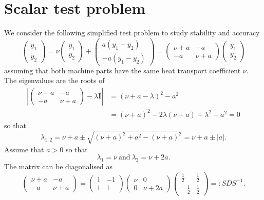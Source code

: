 \documentclass{article}
\newcommand{\ve}[1]{\mathbf{#1}}
\begin{document}
\section*{Scalar test problem}
We consider the following simplified test problem to study stability and accuracy
\begin{equation}
	\begin{pmatrix} \dot{y}_1 \\ \dot{y}_2 \end{pmatrix} = \nu \begin{pmatrix} y_1 \\ y_2 \end{pmatrix} + \begin{pmatrix} a \left( y_1 - y_2 \right) \\ -a (y_1 - y_2) \end{pmatrix}
		= \begin{pmatrix}  \nu + a & -a \\ -a & \nu  +a \end{pmatrix} \begin{pmatrix} y_1 \\ y_2 \end{pmatrix}
\end{equation}
assuming that both machine parts have the same heat transport coefficient $\nu$.
The eigenvalues are the roots of
\begin{align*}
	\left| \begin{pmatrix}  \nu + a & -a \\ -a & \nu  +a \end{pmatrix} - \lambda \ve{I} \right| &= \left( \nu + a - \lambda \right)^2 - a^2 \\
	&= \left( \nu + a \right)^2 - 2 \lambda \left( \nu + a \right) + \lambda^2 - a^2 = 0
\end{align*}
so that
\begin{equation}
	\lambda_{1,2} = \nu + a \pm \sqrt{ \left(\nu+a\right)^2 + a^2 - \left( \nu + a \right)^2 } = \nu + a \pm \left| a \right|.
\end{equation}
Assume that $a > 0$ so that
\begin{equation}
	\lambda_1 = \nu \ \text{and} \ \lambda_2 = \nu + 2 a.
\end{equation}
The matrix can be diagonalised as
\begin{equation}
	\begin{pmatrix} \nu+a & -a \\ -a & \nu + a \end{pmatrix} = \begin{pmatrix} 1 & -1 \\ 1 & 1 \end{pmatrix} \begin{pmatrix} \nu & 0 \\ 0 & \nu + 2 a \end{pmatrix} \begin{pmatrix} \frac{1}{2} & \frac{1}{2} \\ -\frac{1}{2} & \frac{1}{2} \end{pmatrix} =: S D S^{-1}.
\end{equation}
\end{document}
